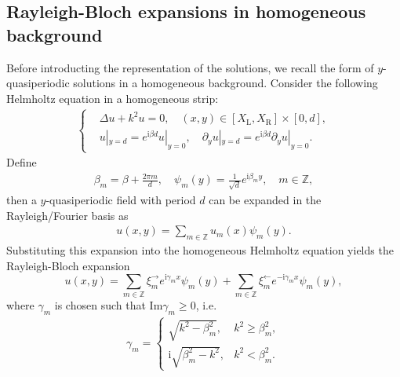 \documentclass[11pt,fleqn]{article}
\renewcommand{\Im}{\mathrm{Im}}
\newcommand{\ii}{\mathrm{i}}
\theoremstyle{definition}
\theoremstyle{remark}
\begin{document}
\subsection{Rayleigh-Bloch expansions in homogeneous background}
Before introducting the representation of the solutions, we recall the form of 
$y$-quasiperiodic solutions in a homogeneous background. Consider the following Helmholtz equation in a homogeneous strip:\begin{align*}
\begin{cases}
  &\Delta u + k^2 u = 0, \quad (x, y) \in [X_\mathrm{L},X_\mathrm{R}] \times [0,d],\\
  &u|_{y = d} = e^{\ii\beta d} u|_{y = 0}, \quad \partial_y u|_{y = d} = e^{\ii\beta d} \partial_y u|_{y = 0}.
\end{cases}
\end{align*}
Define \begin{align*}
  \beta_m = \beta + \frac{2\pi m}{d},\quad \psi_m(y) = \frac{1}{\sqrt{d}} e^{\ii \beta_m y},\quad m \in \mathbb{Z},
\end{align*}
then a $y$-quasiperiodic field with period $d$ can be expanded in the Rayleigh/Fourier basis as 
\begin{align*}
  u(x,y) = \sum_{m\in\mathbb{Z}} u_m(x) \psi_m(y).
\end{align*}
Substituting this expansion into the homogeneous Helmholtz equation yields the 
Rayleigh-Bloch expansion \[
  u(x,y)= \sum_{m\in\mathbb Z} \xi_m^\rightarrow e^{\ii\gamma_m x}\psi_m(y) + 
  \sum_{m\in\mathbb Z} \xi_m^\leftarrow e^{-\ii\gamma_m x}\psi_m(y),
\]
where $\gamma_m$ is chosen such that $\Im \gamma_m \geq 0$, i.e. \begin{align*}
  \gamma_m = \begin{cases}
    \sqrt{k^2 - \beta_m^2}, & k^2 \geq \beta_m^2,\\
    \ii\sqrt{\beta_m^2 - k^2}, & k^2 < \beta_m^2.
  \end{cases}
\end{align*}
\end{document}
